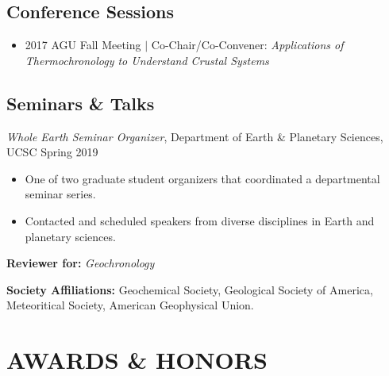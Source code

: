 \documentclass[10pt]{article}
\begin{document}
\subsection*{\textbf{Conference Sessions}}
\begin{itemize}
	\item 2017 AGU Fall Meeting $|$ Co-Chair/Co-Convener: \textit{Applications of Thermochronology to Understand Crustal Systems}
\end{itemize}

\subsection*{\textbf{Seminars \& Talks}}
\textit{Whole Earth Seminar Organizer}, Department of Earth \& Planetary Sciences, UCSC \hfill  Spring 2019
\begin{itemize}
	\item One of two graduate student organizers that coordinated a departmental seminar series.
	\item Contacted and scheduled speakers from diverse disciplines in Earth and planetary sciences.
\end{itemize}

\vspace{2ex}
\begin{hangparas}{5ex}{1}
	\textbf{Reviewer for:} \textit{Geochronology}

	\vspace{2ex}
	\textbf{Society Affiliations:} Geochemical Society, Geological Society of America, Meteoritical Society, American Geophysical Union.
\end{hangparas}



\section*{AWARDS \& HONORS}
\end{document}
